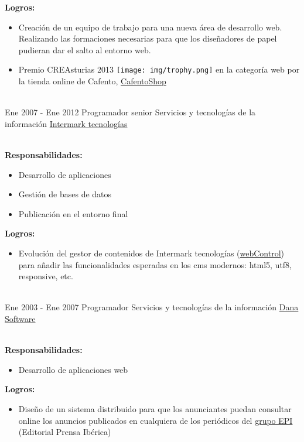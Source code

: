 \documentclass[letterpaper]{twentysecondcv} %
\begin{document}
\begin{twenty}
{		\textbf{Logros:}
		\begin{itemize}
			\item Creación de un equipo de trabajo para una nueva área de desarrollo web. Realizando las formaciones necesarias para que los diseñadores de papel pudieran dar el salto al entorno web.
			\item Premio CREAsturias 2013 {\texttt{[image: img/trophy.png]}}
				en la categoría web por la tienda online de Cafento, \href{https://www.cafentoshop.com/}{CafentoShop}
		\end{itemize}
	}
	\\
	\twentyitem%
	{Ene 2007 -}
	{Ene 2012}
	{Programador senior}
	{Servicios y tecnologías de la información}
	{\href{http://www.intermarktecnologias.com/}{Intermark tecnologías}}
	{\\
		\textbf{Responsabilidades:}
		\begin{itemize}
			\item Desarrollo de aplicaciones
			\item Gestión de bases de datos
			\item Publicación en el entorno final
		\end{itemize}

		\textbf{Logros:}
		\begin{itemize}
			\item Evolución del gestor de contenidos de Intermark tecnologías (\href{http://www.webcontrol.es/es/}{webControl}) para añadir las funcionalidades esperadas en los cms modernos: html5, utf8, responsive, etc.
		\end{itemize}
	}
	\\
	\twentyitem%
	{Ene 2003 -}
	{Ene 2007}
	{Programador}
	{Servicios y tecnologías de la información}
	{\href{http://www.danasoftware.com/}{Dana Software}}
	{\\
		\textbf{Responsabilidades:}
		\begin{itemize}
			\item Desarrollo de aplicaciones web
		\end{itemize}

		\textbf{Logros:}
		\begin{itemize}
			\item Diseño de un sistema distribuido para que los anunciantes puedan consultar online los anuncios publicados en cualquiera de los periódicos del \href{http://www.epi.es/}{grupo EPI} (Editorial Prensa Ibérica)
		\end{itemize}
	}

\end{twenty}
\end{document}
